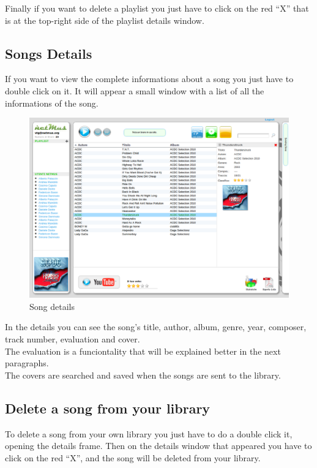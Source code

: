 Finally if you want to delete a playlist you just have to click on the red ``X''
that is at the top-right side of the playlist details window.

\subsection*{Songs Details}

If you want to view the complete informations about a song you just have to
double click on it. It will appear a small window with a list of
all the informations of the song.\\
\begin{figure}[htbp]
  \centering
  \includegraphics[width=15cm]{img/MU/info_song.png}
\caption{Song details}
\end{figure}

In the details you can see the song's title, author, album, genre, year,
composer, track number, evaluation and cover.\\
The evaluation is a funciontality that will be explained better in the next
paragraphs.\\
The covers are searched and saved when the songs are sent to the library.

\subsection*{Delete a song from your library}

To delete a song from your own library you just have to do a double click it, opening 
the details frame. Then on the details window that appeared you have to
click on the red ``X'', and the song will be deleted from your library.

